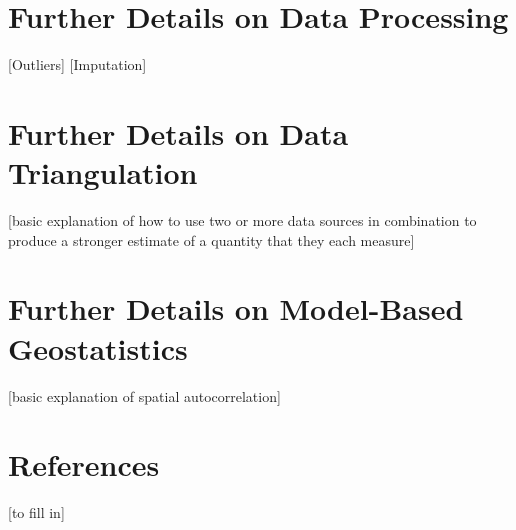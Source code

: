 \documentclass[twocolumn]{bmcart}%
\begin{document}
\section{Further Details on Data Processing} \label{data_processing}

[Outliers] [Imputation] \\




\section{Further Details on Data Triangulation} \label{triangulation}
[basic explanation of how to use two or more data sources in combination to produce a stronger estimate of a quantity that they each measure]\\


\section{Further Details on Model-Based Geostatistics} \label{mbg}
[basic explanation of spatial autocorrelation] \\


\section{References}
[to fill in] \\
\end{document}
